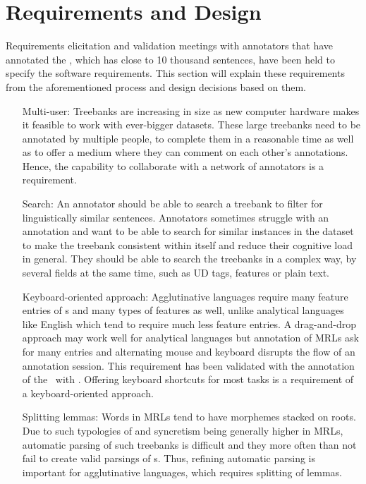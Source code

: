 \section{Requirements and Design}
\label{sec:requirements}

Requirements elicitation and validation meetings with annotators that have annotated the \bountreebank, which has close to 10 thousand sentences, have been held to specify the software requirements.
This section will explain these requirements from the aforementioned process and design decisions based on them.

\begin{itemize}[before=\normalfont, font=\itshape, align=left]
    \item[Multi-user:]
        Treebanks are increasing in size as new computer hardware makes it feasible to work with ever-bigger datasets.
        These large treebanks need to be annotated by multiple people, to complete them in a reasonable time as well as to offer a medium where they can comment on each other's annotations.
        Hence, the capability to collaborate with a network of annotators is a requirement.

    \item[Search:]
        An annotator should be able to search a treebank to filter for linguistically similar sentences.
        Annotators sometimes struggle with an annotation and want to be able to search for similar instances in the dataset to make the treebank consistent within itself and reduce their cognitive load in general.
        They should be able to search the treebanks in a complex way, by several fields at the same time, such as UD tags, features or plain text.

    \item[Keyboard-oriented approach:]
        Agglutinative languages require many feature entries of \form s and many types of features as well, unlike analytical languages like English which tend to require much less feature entries.
        A drag-and-drop approach may work well for analytical languages but annotation of MRLs ask for many entries and alternating mouse and keyboard disrupts the flow of an annotation session.
        This requirement has been validated with the annotation of the \bountreebank\ with \boatvone.
        Offering keyboard shortcuts for most tasks is a requirement of a keyboard-oriented approach.

    \item[Splitting lemmas:]
        Words in MRLs tend to have morphemes stacked on roots.
        Due to such typologies of and syncretism being generally higher in MRLs, automatic parsing of such treebanks is difficult and they more often than not fail to create valid parsings of \form s.
        Thus, refining automatic parsing is important for agglutinative languages, which requires splitting of lemmas.


\end{itemize}
